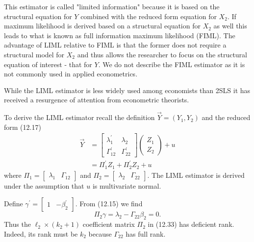 \documentclass[10pt]{article}
\begin{document}
This estimator is called "limited information" because it is based on the structural equation for $Y$ combined with the reduced form equation for $X_{2}$. If maximum likelihood is derived based on a structural equation for $X_{2}$ as well this leads to what is known as full information maximum likelihood (FIML). The advantage of LIML relative to FIML is that the former does not require a structural model for $X_{2}$ and thus allows the researcher to focus on the structural equation of interest - that for $Y$. We do not describe the FIML estimator as it is not commonly used in applied econometrics.

While the LIML estimator is less widely used among economists than 2SLS it has received a resurgence of attention from econometric theorists.

To derive the LIML estimator recall the definition $\vec{Y}=\left(Y_{1}, Y_{2}\right)$ and the reduced form (12.17)
$$
\begin{aligned}
\vec{Y} &=\left[\begin{array}{cc}
\lambda_{1}^{\prime} & \lambda_{2} \\
\Gamma_{12}^{\prime} & \Gamma_{22}^{\prime}
\end{array}\right]\left(\begin{array}{l}
Z_{1} \\
Z_{2}
\end{array}\right)+u \\
&=\Pi_{1}^{\prime} Z_{1}+\Pi_{2}^{\prime} Z_{2}+u
\end{aligned}
$$
where $\Pi_{1}=\left[\begin{array}{cc}\lambda_{1} & \Gamma_{12}\end{array}\right]$ and $\Pi_{2}=\left[\begin{array}{cc}\lambda_{2} & \Gamma_{22}\end{array}\right]$. The LIML estimator is derived under the assumption that $u$ is multivariate normal.

Define $\gamma^{\prime}=\left[\begin{array}{ll}1 & -\beta_{2}^{\prime}\end{array}\right]$. From (12.15) we find
$$
\Pi_{2} \gamma=\lambda_{2}-\Gamma_{22} \beta_{2}=0 .
$$
Thus the $\ell_{2} \times\left(k_{2}+1\right)$ coefficient matrix $\Pi_{2}$ in (12.33) has deficient rank. Indeed, its rank must be $k_{2}$ because $\Gamma_{22}$ has full rank.
\end{document}
